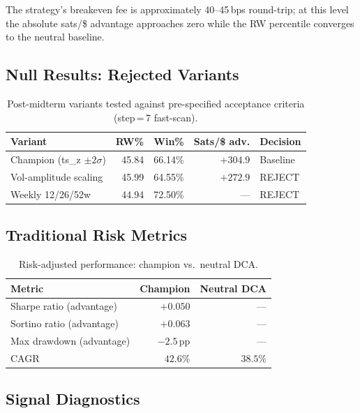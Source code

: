 \documentclass[11pt,letterpaper]{article}
\begin{document}
The strategy's breakeven fee is approximately 40--45\,bps round-trip; at this
level the absolute sats/\$ advantage approaches zero while the RW percentile
converges to the neutral baseline.

\subsection{Null Results: Rejected Variants}

\begin{table}[H]
  \centering
  \caption{Post-midterm variants tested against pre-specified acceptance
           criteria (step\,=\,7 fast-scan).}
  \label{tab:null_results}
  \begin{tabular}{lrrrl}
    \toprule
    \textbf{Variant} & \textbf{RW\%} & \textbf{Win\%} &
    \textbf{Sats/\$ adv.} & \textbf{Decision} \\
    \midrule
    Champion (ts\_z $\pm2\sigma$) & 45.84 & 66.14\% & $+304.9$ & Baseline \\
    Vol-amplitude scaling         & 45.99 & 64.55\% & $+272.9$ & REJECT   \\
    Weekly 12/26/52w              & 44.94 & 72.50\% & ---       & REJECT   \\
    \bottomrule
  \end{tabular}
\end{table}

\subsection{Traditional Risk Metrics}

\begin{table}[H]
  \centering
  \caption{Risk-adjusted performance: champion vs.\ neutral DCA.}
  \label{tab:trad_metrics}
  \begin{tabular}{lrr}
    \toprule
    \textbf{Metric} & \textbf{Champion} & \textbf{Neutral DCA} \\
    \midrule
    Sharpe ratio (advantage) & $+0.050$ & --- \\
    Sortino ratio (advantage) & $+0.063$ & --- \\
    Max drawdown (advantage) & $-2.5$\,pp & --- \\
    CAGR & $42.6\%$ & $38.5\%$ \\
    \bottomrule
  \end{tabular}
\end{table}

\subsection{Signal Diagnostics}
\end{document}
